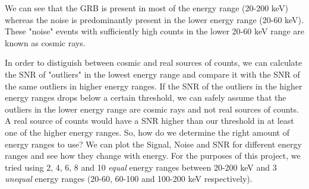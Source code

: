 \documentclass[11pt]{book} %
\begin{document}
We can see that the GRB is present in most of the energy range (20-200 keV) whereas the noise is predominantly present in the lower energy range (20-60 keV). These "noise" events with sufficiently high counts in the lower 20-60 keV range are known as cosmic rays. 

In order to distiguish between cosmic and real sources of counts, we can calculate the SNR of "outliers" in the lowest energy range and compare it with the SNR of the same outliers in higher energy ranges. If the SNR of the outliers in the higher energy ranges drops below a certain threshold, we can safely assume that the outliers in the lower energy range are cosmic rays and not real sources of counts. A real source of counts would have a SNR higher than our threshold in at least one of the higher energy ranges.
\newpage
So, how do we determine the right amount of energy ranges to use? We can plot the Signal, Noise and SNR for different energy ranges and see how they change with energy. For the purposes of this project, we tried using 2, 4, 6, 8 and 10 \textit{equal} energy ranges between 20-200 keV and 3 \textit{unequal} energy ranges (20-60, 60-100 and 100-200 keV respectively).
\end{document}

